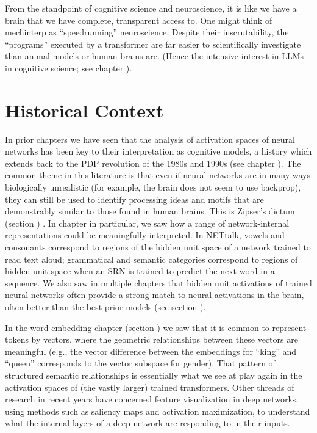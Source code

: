 From the standpoint of cognitive science and neuroscience, it is like we have a
brain that we have complete, transparent access to. One might think of
mechinterp as ``speedrunning'' neuroscience. Despite their
inscrutability, the ``programs'' executed by a transformer are far easier to
scientifically investigate than animal models or human brains are. (Hence the
intensive interest in LLMs in cognitive science; see chapter
).


\section{Historical Context}\label{mechInterpHist}

In prior chapters we have seen that the analysis of activation spaces of neural
networks has been key to their interpretation as cognitive models, a history
which extends back to the PDP revolution of the 1980s and 1990s (see chapter
). The common theme in this literature is that even if
neural networks are in many ways biologically unrealistic (for example, the
brain does not seem to use backprop), they can still be used to identify
processing ideas and motifs that are demonstrably similar to those found in
human brains. This is Zipser's dictum (section )
\cite{zipser1992identification}. In chapter
 in particular, we saw how a range of
network-internal representations could be meaningfully interpreted. In NETtalk,
vowels and consonants correspond to regions of the hidden unit space of a
network trained to read text aloud; grammatical and semantic
categories correspond to regions of hidden unit space when an SRN is trained
to predict the next word in a sequence. We also saw in multiple chapters that
hidden unit activations of trained neural networks often provide a strong match
to neural activations in the brain, often better than the best prior models
(see section ).

In the word embedding chapter (section ) we saw
that it is common to represent tokens by vectors, where the geometric
relationships between these vectors are meaningful (e.g., the vector difference
between the embeddings for ``king'' and ``queen'' corresponds to the vector
subspace for gender). That pattern of structured semantic relationships is
essentially what we see at play again in the activation spaces of (the vastly
larger) trained transformers. Other threads of research in recent years have
concerned feature visualization in deep networks, using methods such as
saliency maps and activation maximization, to understand what the internal
layers of a deep network are responding to in their inputs.

